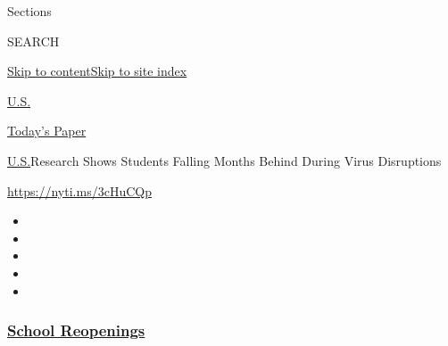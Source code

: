 Sections

SEARCH

\protect\hyperlink{site-content}{Skip to
content}\protect\hyperlink{site-index}{Skip to site index}

\href{https://www.nytimes3xbfgragh.onion/section/us}{U.S.}

\href{https://myaccount.nytimes3xbfgragh.onion/auth/login?response_type=cookie\&client_id=vi}{}

\href{https://www.nytimes3xbfgragh.onion/section/todayspaper}{Today's
Paper}

\href{/section/us}{U.S.}\textbar{}Research Shows Students Falling Months
Behind During Virus Disruptions

\url{https://nyti.ms/3cHuCQp}

\begin{itemize}
\item
\item
\item
\item
\item
\end{itemize}

\hypertarget{school-reopenings}{%
\subsubsection{\texorpdfstring{\href{https://www.nytimes3xbfgragh.onion/spotlight/schools-reopening?name=styln-coronavirus-schools-reopening\&region=TOP_BANNER\&block=storyline_menu_recirc\&action=click\&pgtype=Article\&impression_id=72c01050-f52b-11ea-8e93-c18eceeec4bb\&variant=undefined}{School
Reopenings}}{School Reopenings}}\label{school-reopenings}}

